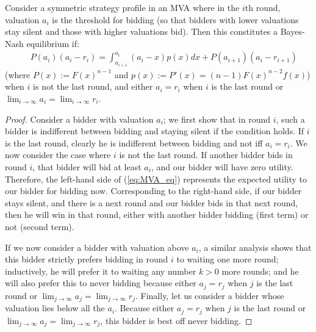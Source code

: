 \begin{lemma}
  Consider a symmetric strategy profile in an MVA where in the $i$th round,
  valuation $a_i$ is the threshold for bidding (so that bidders with lower
  valuations stay silent and those with higher valuations bid).  Then this
  constitutes a Bayes-Nash equilibrium if:
\begin{align}\label{eq:MVA_eq}
    &~~P(a_{i})(a_{i}-r_i) =
    \int_{a_{i+1}}^{a_{i}}(a_{i}-x)p(x)dx+P(a_{i+1})(a_{i}-r_{i+1})
\end{align}
(where 
$P(x) := F(x)^{n-1}$ and $p(x) := P'(x) = (n-1)F(x)^{n-2} f(x)$)
when $i$ is not the last round, and either $a_i=r_i$ when $i$ is the last
round or $\lim_{i \rightarrow \infty} a_i = \lim_{i \rightarrow \infty}
r_i$.
\label{lemma:sufficient}
\end{lemma}
\begin{proof}
  Consider a bidder with valuation $a_i$; we first show that in round $i$,
  such a bidder is indifferent between bidding and staying silent if the
  condition holds.  If $i$ is the last round, clearly he is indifferent
  between bidding and not iff $a_i=r_i$.  We now consider the case where
  $i$ is not the last round.  If another bidder bids in round $i$, that
  bidder will bid at least $a_i$, and our bidder will have zero utility.
  Therefore, the left-hand side of (\ref{eq:MVA_eq}) represents the
  expected utility to our bidder for bidding now.  Corresponding to the
  right-hand side, if our bidder stays silent, and there is a next round
  and our bidder bids in that next round, then he will win in that round,
  either with another bidder bidding (first term) or not (second term).

  If we now consider a bidder with valuation above $a_i$, a similar
  analysis shows that this bidder strictly prefers bidding in round $i$ to
  waiting one more round; inductively, he will prefer it to waiting any
  number $k > 0$ more rounds; and he will also prefer this to never bidding
  because either $a_j=r_j$ when $j$ is the last round or $\lim_{j
    \rightarrow \infty} a_j = \lim_{j \rightarrow \infty} r_j$.   Finally,
  let us consider a bidder whose valuation lies below all the $a_i$.
  Because either $a_j=r_j$ when $j$ is the last round or $\lim_{j
    \rightarrow \infty} a_j = \lim_{j \rightarrow \infty} r_j$, this bidder
  is best off never bidding.
\end{proof}


